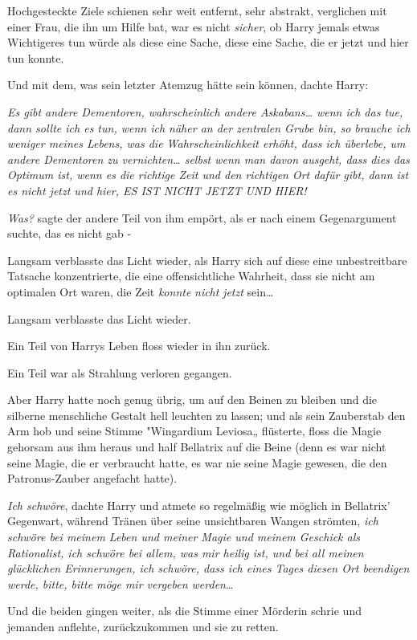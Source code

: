 {Hochgesteckte Ziele schienen sehr weit entfernt, sehr abstrakt, verglichen mit einer Frau, die ihn um Hilfe bat, war es nicht \emph{sicher}, ob Harry jemals etwas Wichtigeres tun würde als diese eine Sache, diese eine Sache, die er jetzt und hier tun konnte.

Und mit dem, was sein letzter Atemzug hätte sein können, dachte Harry:

\emph{Es gibt andere Dementoren, wahrscheinlich andere Askabans… wenn ich das tue, dann sollte ich es tun, wenn ich näher an der zentralen Grube bin, so brauche ich weniger meines Lebens, was die Wahrscheinlichkeit erhöht, dass ich überlebe, um andere Dementoren zu vernichten… selbst wenn man davon ausgeht, dass dies das Optimum ist, wenn es die richtige Zeit und den richtigen Ort dafür gibt, dann ist es nicht jetzt und hier, ES IST NICHT JETZT UND HIER!}

\emph{Was?} sagte der andere Teil von ihm empört, als er nach einem Gegenargument suchte, das es nicht gab -

Langsam verblasste das Licht wieder, als Harry sich auf diese eine unbestreitbare Tatsache konzentrierte, die eine offensichtliche Wahrheit, dass sie nicht am optimalen Ort waren, die Zeit \emph{konnte} \emph{nicht} \emph{jetzt} sein…

Langsam verblasste das Licht wieder.

Ein Teil von Harrys Leben floss wieder in ihn zurück.

Ein Teil war als Strahlung verloren gegangen.

Aber Harry hatte noch genug übrig, um auf den Beinen zu bleiben und die silberne menschliche Gestalt hell leuchten zu lassen; und als sein Zauberstab den Arm hob und seine Stimme "Wingardium Leviosa„ flüsterte, floss die Magie gehorsam aus ihm heraus und half Bellatrix auf die Beine (denn es war nicht seine Magie, die er verbraucht hatte, es war nie seine Magie gewesen, die den Patronus-Zauber angefacht hatte).

\emph{Ich schwöre}, dachte Harry und atmete so regelmäßig wie möglich in Bellatrix' Gegenwart, während Tränen über seine unsichtbaren Wangen strömten, \emph{ich schwöre bei meinem Leben und meiner Magie und meinem Geschick als Rationalist, ich schwöre bei allem, was mir heilig ist, und bei all meinen glücklichen Erinnerungen, ich schwöre, dass ich eines Tages diesen Ort beendigen werde, bitte, bitte möge mir vergeben werden}…

Und die beiden gingen weiter, als die Stimme einer Mörderin schrie und jemanden anflehte, zurückzukommen und sie zu retten.

}
